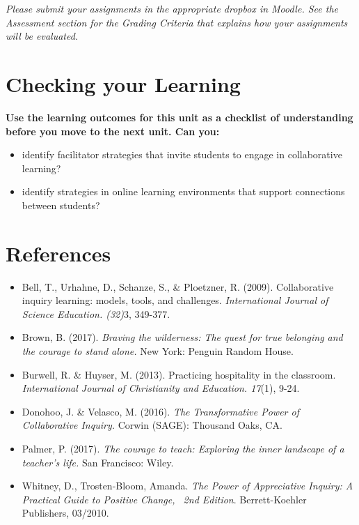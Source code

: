 \documentclass[
]{book}
\providecommand{\tightlist}{%
  \setlength{\itemsep}{0pt}\setlength{\parskip}{0pt}}
\begin{document}
\begin{caution}
\emph{Please submit your assignments in the appropriate dropbox in
Moodle. See the Assessment section for the Grading Criteria that
explains how your assignments will be evaluated.}
\end{caution}

\hypertarget{checking-your-learning-4}{%
\section*{Checking your Learning}\label{checking-your-learning-4}}

\begin{progress}
\textbf{Use the learning outcomes for this unit as a checklist of
understanding before you move to the next unit. Can you:}

\begin{itemize}
\tightlist
\item
  identify facilitator strategies that invite students to engage in
  collaborative learning?\\
\item
  identify strategies in online learning environments that support
  connections between students?
\end{itemize}
\end{progress}

\hypertarget{references-2}{%
\section*{References}\label{references-2}}

\begin{itemize}
\tightlist
\item
  Bell, T., Urhahne, D., Schanze, S., \& Ploetzner, R. (2009). Collaborative inquiry learning: models, tools, and challenges. \emph{International Journal of Science Education. (32)}3, 349-377.\\
\item
  Brown, B. (2017). \emph{Braving the wilderness: The quest for true belonging and the courage to stand alone.} New York: Penguin Random House.\\
\item
  Burwell, R. \& Huyser, M. (2013). Practicing hospitality in the classroom. \emph{International Journal of Christianity and Education. 17}(1), 9-24.\\
\item
  Donohoo, J. \& Velasco, M. (2016). \emph{The Transformative Power of Collaborative Inquiry.} Corwin (SAGE): Thousand Oaks, CA.\\
\item
  Palmer, P. (2017). \emph{The courage to teach: Exploring the inner landscape of a teacher's life.} San Francisco: Wiley.\\
\item
  Whitney, D., Trosten-Bloom, Amanda. \emph{The Power of Appreciative Inquiry: A Practical Guide to Positive Change,~ 2nd Edition}. Berrett-Koehler Publishers, 03/2010.
\end{itemize}
\end{document}
